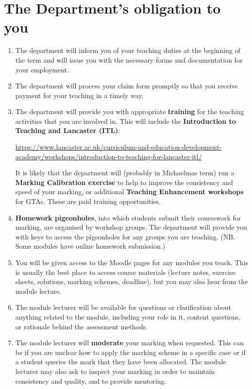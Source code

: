 \documentclass[11pt,a4paper]{amsart}
\begin{document}
\newpage

\section{The Department's obligation to you}

\begin{enumerate}
\item  The department will inform you of your teaching duties at the beginning of the term and will issue you with the necessary forms and documentation for your employment.
\item The department will process your claim form promptly so that you receive payment for your teaching in a timely way.
\item The department will provide you with appropriate {\bf training} for the teaching activities that you are involved in.
This will include the {\bf Introduction to Teaching and Lancaster (ITL)}:
\begin{center} \url{https://www.lancaster.ac.uk/curriculum-and-education-development-academy/workshops/introduction-to-teaching-for-lancaster-itl/} \end{center} \par
It is likely that the department will (probably in Michaelmas term) run a {\bf Marking Calibration exercise} to help to improve the consistency and speed of your marking, or additional {\bf Teaching Enhancement workshops} for GTAs. These are paid training opportunities.
\item {\bf Homework pigeonholes}, into which students submit their coursework for marking, are organised by workshop groups. The department will provide you with keys to access the pigeonholes for any groups you are teaching. 
(NB. Some modules have online homework submission.)
\item  You will be given access to the Moodle pages for any modules you teach. This is usually the best place to access course materials (lecture notes, exercise sheets, solutions, marking schemes, deadline), but you may also hear from the module lecture.
\item The module lecturer will be available for questions or clarification about anything related to the module, including your role in it, content questions, or rationale behind the assessment methods.
\item The module lecturer will {\bf moderate} your marking when requested. This can be if you are unclear how to apply the marking scheme in a specific case or if a student queries the mark that they have been allocated. The module lecturer may also ask to inspect your marking in order to maintain consistency and quality, and to provide mentoring.

\end{enumerate}
\end{document}
